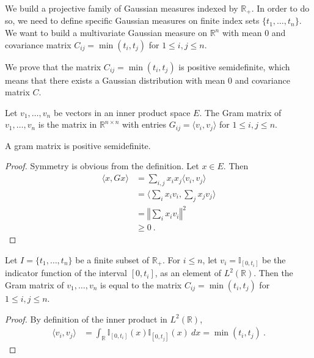We build a projective family of Gaussian measures indexed by $\mathbb{R}_+$.
In order to do so, we need to define specific Gaussian measures on finite index sets $\{t_1, \ldots, t_n\}$.
We want to build a multivariate Gaussian measure on $\mathbb{R}^n$ with mean $0$ and covariance matrix $C_{ij} = \min(t_i, t_j)$ for $1 \leq i,j \leq n$.

We prove that the matrix $C_{ij} = \min(t_i, t_j)$ is positive semidefinite, which means that there exists a Gaussian distribution with mean 0 and covariance matrix $C$.

\begin{definition}\label{def:gramMatrix}
  \mathlibok
Let $v_1, \ldots, v_n$ be vectors in an inner product space $E$.
The Gram matrix of $v_1, \ldots, v_n$ is the matrix in $\mathbb{R}^{n \times n}$ with entries $G_{ij} = \langle v_i, v_j \rangle$ for $1 \leq i,j \leq n$.
\end{definition}


\begin{lemma}\label{lem:posSemidef_gramMatrix}
  \mathlibok
A gram matrix is positive semidefinite.
\end{lemma}

\begin{proof}\leanok
Symmetry is obvious from the definition.
Let $x \in E$. Then
\begin{align*}
  \langle x, G x \rangle
  &= \sum_{i,j} x_i x_j \langle v_i, v_j \rangle
  \\
  &= \langle \sum_i x_i v_i, \sum_j x_j v_j \rangle
  \\
  &= \left\Vert \sum_i x_i v_i \right\Vert^2
  \\
  &\ge 0
  \: .
\end{align*}
\end{proof}


\begin{lemma}\label{lem:C_eq_gramMatrix}
  \leanok
Let $I = \{t_1, \ldots, t_n\}$ be a finite subset of $\mathbb{R}_+$.
For $i \le n$, let $v_i = \mathbb{I}_{[0, t_i]}$ be the indicator function of the interval $[0, t_i]$, as an element of $L^2(\mathbb{R})$.
Then the Gram matrix of $v_1, \ldots, v_n$ is equal to the matrix $C_{ij} = \min(t_i, t_j)$ for $1 \leq i,j \leq n$.
\end{lemma}

\begin{proof}\leanok
By definition of the inner product in $L^2(\mathbb{R})$,
\begin{align*}
  \langle v_i, v_j \rangle
  &= \int_{\mathbb{R}} \mathbb{I}_{[0, t_i]}(x) \mathbb{I}_{[0, t_j]}(x) \: dx
  = \min(t_i, t_j)
  \: .
\end{align*}
\end{proof}


